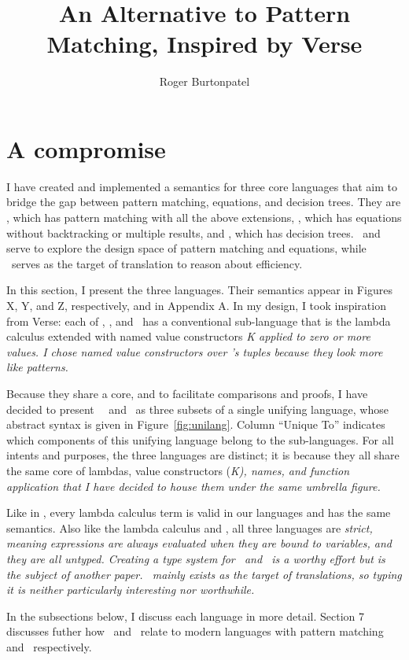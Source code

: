 \documentclass[manuscript,screen,review, 12pt, nonacm]{acmart}
\title{An Alternative to Pattern Matching, Inspired by Verse}
\author{Roger Burtonpatel}
\affiliation{%
\institution{Tufts University}
\streetaddress{419 Boston Ave}
  \city{Medford}
  \state{Massachusetts}
  \country{USA}
  \postcode{02155}
  }
\begin{document}
  
\section{A compromise}
    I have created and implemented a semantics for three core languages that aim
    to bridge the gap between pattern matching, equations, and decision trees.
    They are \PPlus, which has pattern matching with all the above extensions,
    \VMinus, which has equations without backtracking or multiple results, and
    \D, which has decision trees. \PPlus\ and \VMinus serve to explore the
    design space of pattern matching and equations, while \D\ serves as the
    target of translation to reason about efficiency. 

    In this section, I present the three languages. Their semantics appear in
    Figures X, Y, and Z, respectively, and in Appendix A. In my design, I took
    inspiration from Verse: each of \PPlus, \VMinus, and \D\ has a conventional
    sub-language that is the lambda calculus extended with named value
    constructors \it{K} applied to zero or more values. I chose named value
    constructors over \VC's tuples because they look more like patterns. 
    
    Because they share a core, and to facilitate comparisons and proofs, I have
    decided to present \VMinus\, \PPlus\, and \D\ as three subsets of a single
    unifying language, whose abstract syntax is given in
    Figure~\ref{fig:unilang}. Column “Unique To” indicates which components of
    this unifying language belong to the sub-languages. For all intents and
    purposes, the three languages are distinct; it is because they all share the
    same core of lambdas, value constructors (\it{K}), names, and function
    application that I have decided to house them under the same umbrella
    figure. 
    
    Like in \VC, every lambda calculus term is valid in our languages and has
    the same semantics. Also like the lambda calculus and \VC, all three
    languages are \it{strict}, meaning expressions are always evaluated when
    they are bound to variables, and they are all untyped. Creating a type
    system for \PPlus\ and \VMinus\ is a worthy effort but is the subject of
    another paper. \D\ mainly exists as the target of translations, so typing it
    is neither particularly interesting nor worthwhile. 
    
    In the subsections below, I discuss each language in more detail. Section 7
    discusses futher how \PPlus\ and \VMinus\ relate to modern languages with
    pattern matching and \VC\ respectively. 
\end{document}
